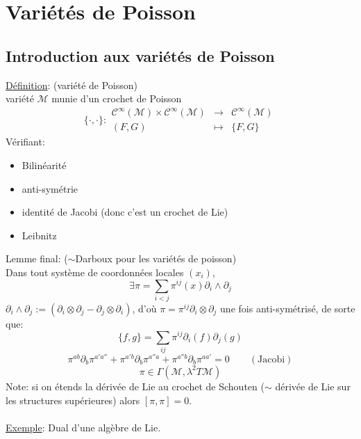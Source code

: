 \documentclass[a4paper,11pt]{article}
\begin{document}
\section{Variétés de Poisson}
\subsection{Introduction aux variétés de Poisson}
\underline{Définition}: (variété de Poisson)\\
variété $\mathcal{M}$ munie d'un crochet de Poisson
$$\{\cdot,\cdot\}: \begin{matrix}
\mathcal{C}^\infty(\mathcal{M})\times\mathcal{C}^\infty(\mathcal{M}) & \to & \mathcal{C}^\infty(\mathcal{M})\\
(F,G) & \mapsto & \{F,G\}
\end{matrix}$$
Vérifiant:
\begin{itemize}
\item Bilinéarité
\item anti-symétrie
\item identité de Jacobi (donc c'est un crochet de Lie)
\item Leibnitz
\end{itemize}

\noindent Lemme final: ($\sim$Darboux pour les variétés de poisson)\\
Dans tout système de coordonnées locales $(x_i)$,
$$\exists \pi = \sum_{i<j} \pi^{ij}(x) \partial_i \wedge\partial_j$$
$\partial_i\wedge\partial_j:=(\partial_i\otimes\partial_j-\partial_j\otimes\partial_i)$, d'où $\pi = \pi^{ij}\partial_i\otimes\partial_j$ une fois anti-symétrisé, de sorte que:
$$\{f,g\} = \sum_{ij}\pi^{ij} \partial_i (f) \partial_j (g)$$
$$\pi^{ab}\partial_b\pi^{a'a''} + \pi^{a'b}\partial_b \pi^{a''a}+\pi^{a''b}\partial_b\pi^{aa'}=0 \quad \quad(\mathrm{Jacobi})$$
$$\pi \in \Gamma(\mathcal{M},\lambda^2 T\mathcal{M})$$
Note: si on étends la dérivée de Lie au crochet de Schouten ($\sim$ dérivée de Lie sur les structures supérieures) alors $[\pi,\pi]=0$.
\\ \\
\underline{Exemple}: Dual d'une algèbre de Lie.
\end{document}
